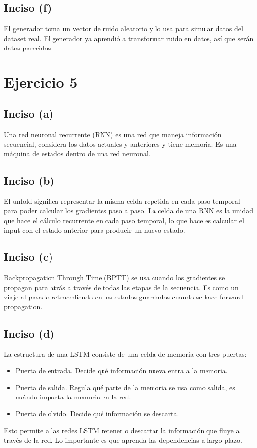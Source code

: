 \documentclass[12pt, a4paper]{article}
\begin{document}
        \subsection*{Inciso (f)}
            \noindent El generador toma un vector de ruido aleatorio y lo usa para simular datos del dataset real. El generador ya aprendió a transformar ruido en datos, así que serán datos parecidos.
    \section*{Ejercicio 5}
        \subsection*{Inciso (a)}
            \noindent Una red neuronal recurrente (RNN) es una red que maneja información secuencial, considera los datos actuales y anteriores y tiene memoria. Es una máquina de estados dentro de una red neuronal.
        \subsection*{Inciso (b)}
            \noindent El unfold significa representar la misma celda repetida en cada paso temporal para poder calcular los gradientes paso a paso. La celda de una RNN es la unidad que hace el cálculo recurrente en cada paso temporal, lo que hace es calcular el input con el estado anterior para producir un nuevo estado.
        \subsection*{Inciso (c)}
            \noindent Backpropagation Through Time (BPTT) se usa cuando los gradientes se propagan para atrás a través de todas las etapas de la secuencia. Es como un viaje al pasado retrocediendo en los estados guardados cuando se hace forward propagation.
        \subsection*{Inciso (d)}
            \noindent La estructura de una LSTM consiste de una celda de memoria con tres puertas:
            \begin{itemize}
                \item Puerta de entrada. Decide qué información nueva entra a la memoria.
                \item Puerta de salida. Regula qué parte de la memoria se usa como salida, es cuándo impacta la memoria en la red.
                \item Puerta de olvido. Decide qué información se descarta.
            \end{itemize}
            \noindent Esto permite a las redes LSTM retener o descartar la información que fluye a través de la red. Lo importante es que aprenda las dependencias a largo plazo.
\end{document}

